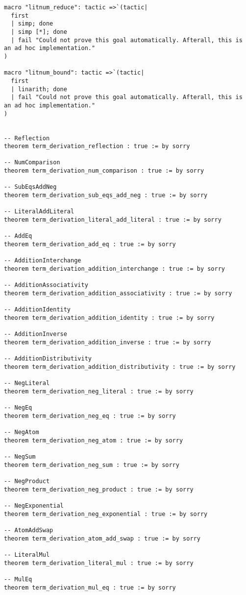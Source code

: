 \documentclass{article}
\begin{document}
\begin{tcolorbox}[colback=white!10, width=\linewidth]
\begin{lstlisting}[language=Lean4]
macro "litnum_reduce": tactic =>`(tactic|
  first
  | simp; done
  | simp [*]; done
  | fail "Could not prove this goal automatically. Afterall, this is an ad hoc implementation."
)

macro "litnum_bound": tactic =>`(tactic|
  first
  | linarith; done
  | fail "Could not prove this goal automatically. Afterall, this is an ad hoc implementation."
)


-- Reflection
theorem term_derivation_reflection : true := by sorry

-- NumComparison
theorem term_derivation_num_comparison : true := by sorry

-- SubEqsAddNeg
theorem term_derivation_sub_eqs_add_neg : true := by sorry

-- LiteralAddLiteral
theorem term_derivation_literal_add_literal : true := by sorry

-- AddEq
theorem term_derivation_add_eq : true := by sorry

-- AdditionInterchange
theorem term_derivation_addition_interchange : true := by sorry

-- AdditionAssociativity
theorem term_derivation_addition_associativity : true := by sorry

-- AdditionIdentity
theorem term_derivation_addition_identity : true := by sorry

-- AdditionInverse
theorem term_derivation_addition_inverse : true := by sorry

-- AdditionDistributivity
theorem term_derivation_addition_distributivity : true := by sorry

-- NegLiteral
theorem term_derivation_neg_literal : true := by sorry

-- NegEq
theorem term_derivation_neg_eq : true := by sorry

-- NegAtom
theorem term_derivation_neg_atom : true := by sorry

-- NegSum
theorem term_derivation_neg_sum : true := by sorry

-- NegProduct
theorem term_derivation_neg_product : true := by sorry

-- NegExponential
theorem term_derivation_neg_exponential : true := by sorry

-- AtomAddSwap
theorem term_derivation_atom_add_swap : true := by sorry

-- LiteralMul
theorem term_derivation_literal_mul : true := by sorry

-- MulEq
theorem term_derivation_mul_eq : true := by sorry


\end{lstlisting}
\end{tcolorbox}
\end{document}
